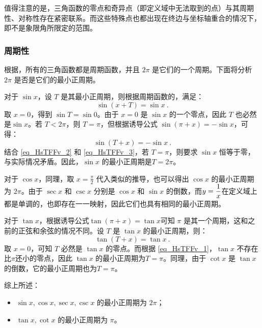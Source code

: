 值得注意的是，三角函数的零点和奇异点（即定义域中无法取到的点）与其周期性、对称性存在紧密联系。而这些特殊点也都出现在终边与坐标轴重合的情况下，即不是象限角所限定的范围。

\subsubsection{周期性}

根据，所有的三角函数都是周期函数，并且 $2\pi$ 是它们的一个周期。下面将分析 $2\pi$ 是否是它们的最小正周期。

对于 $\sin x$，设 $T$ 是其最小正周期，则根据周期函数的，满足：
\begin{equation}\label{eq_HsTFFv_2}
\sin (x+T) = \sin x~.
\end{equation}
取 $x=0$，得到 $\sin T = \sin 0$。由于 $x=0$ 是 $\sin x$ 的一个零点，因此 $T$ 也必然是$\sin x$。若 $T<2\pi$，则 $T=\pi$，但根据诱导公式 $\sin(\pi + x) = -\sin x$，可得：
\begin{equation}\label{eq_HsTFFv_3}
\sin (T + x) = -\sin x~.
\end{equation}
结合 \autoref{eq_HsTFFv_2} 和 \autoref{eq_HsTFFv_3}，若 $T=\pi$，则要求 $\sin x$ 恒等于零，与实际情况矛盾。因此，$\sin x$ 的最小正周期是$T = 2\pi$。

对于 $\cos x$，同理，取 $\displaystyle x=\frac{\pi}{2}$ 代入类似的推导，也可以得出 $\cos x$ 的最小正周期为 $2\pi$。由于 $\sec x$ 和 $\csc x$ 分别是 $\cos x$ 和 $\sin x$ 的倒数，而$\displaystyle y={1\over x}$在定义域上都是单调的，也即存在一一映射，因此它们也具有相同的最小正周期。

对于 $\tan x$，根据诱导公式$\tan (\pi + x) = \tan x$可知 $\pi$ 是其一个周期，这和之前的正弦和余弦的情况不同。设 $T$ 是 $\tan x$ 的最小正周期，则：
\begin{equation}
\tan (T + x) = \tan x~.
\end{equation}
取 $x=0$，可知 $T$ 必然是 $\tan x$ 的零点。而根据 \autoref{eq_HsTFFv_1}，$\tan x$ 不存在比$\pi$还小的零点，因此 $\tan x$ 的最小正周期为$T = \pi$。同理，由于 $\cot x$ 是 $\tan x$ 的倒数，它的最小正周期也为$T = \pi$。

综上所述：
\begin{itemize}
\item $\sin x, \cos x, \sec x, \csc x$ 的最小正周期为 $\displaystyle 2\pi$；
\item $\tan x, \cot x$ 的最小正周期为 $\pi$。
\end{itemize}

